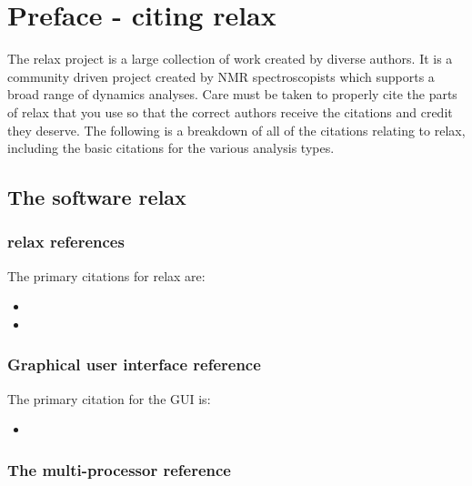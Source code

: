 
\chapter{Preface - citing relax} \label{ch: citations}

The relax project is a large collection of work created by diverse authors.
It is a community driven project created by NMR spectroscopists which supports a broad range of dynamics analyses.
Care must be taken to properly cite the parts of relax that you use so that the correct authors receive the citations and credit they deserve.
The following is a breakdown of all of the citations relating to relax, including the basic citations for the various analysis types.




\section*{The software relax}



\subsection*{relax references}

The primary citations for relax are:
\begin{itemize}
  \item {}
  \item {}
\end{itemize}



\subsection*{Graphical user interface reference}

The primary citation for the GUI is:
\begin{itemize}
  \item {}
\end{itemize}



\subsection*{The multi-processor reference}

